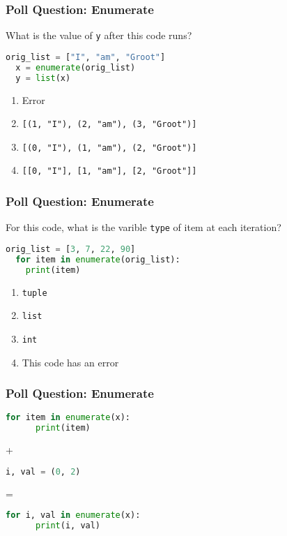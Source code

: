 \documentclass{beamer}
\begin{document}
%
%
\begin{frame}[fragile]
  \frametitle{Poll Question: Enumerate}
  What is the value of \lstinline|y| after this code runs?
  \begin{lstlisting}[language=Python, autogobble]
  orig_list = ["I", "am", "Groot"]
  x = enumerate(orig_list)
  y = list(x)
  \end{lstlisting}
  \vfill
  \begin{enumerate}[A]
    \item Error
    \item \lstinline|[(1, "I"), (2, "am"), (3, "Groot")]|
    \item \lstinline|[(0, "I"), (1, "am"), (2, "Groot")]|
    \item \lstinline|[[0, "I"], [1, "am"], [2, "Groot"]]|
  \end{enumerate}
\end{frame}


%
%
\begin{frame}[fragile]
  \frametitle{Poll Question: Enumerate}
  For this code, what is the varible \lstinline|type| of item at each iteration?
  \begin{lstlisting}[language=Python, autogobble]
  orig_list = [3, 7, 22, 90]
  for item in enumerate(orig_list):
    print(item)
  \end{lstlisting}
  \vfill
  \begin{enumerate}[A]
    \item \lstinline|tuple|
    \item \lstinline|list|
    \item \lstinline|int|
    \item This code has an error
  \end{enumerate}
\end{frame}


%
%
\begin{frame}[fragile]
  \frametitle{Poll Question: Enumerate}
  \begin{minipage}{0.3\textwidth}
    \begin{lstlisting}[language=Python, autogobble, basicstyle=\tiny]
    for item in enumerate(x):
      print(item)
    \end{lstlisting}
  \end{minipage}
  \hfill
  +
  \hfill
  \begin{minipage}{0.2\textwidth}
    \begin{lstlisting}[language=Python, autogobble, basicstyle=\tiny]
    i, val = (0, 2)
    \end{lstlisting}
  \end{minipage}
  \hfill
  =
  \hfill
  \begin{minipage}{0.32\textwidth}
    \begin{lstlisting}[language=Python, autogobble, basicstyle=\tiny]
    for i, val in enumerate(x):
      print(i, val)
    \end{lstlisting}
  \end{minipage}
\end{frame}
\end{document}
